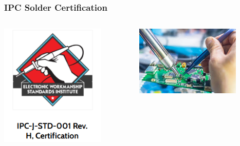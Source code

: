\documentclass{beamer}
\begin{document}
\begin{frame}\frametitle{IPC Solder Certification}
\begin{columns}
\begin{column}{5.5cm}
	\begin{center}	
	\includegraphics[width=5cm]{fig/ipc1.png} 
	\end{center}
\end{column}
\begin{column}{5.5cm}
	\begin{center}	
	\includegraphics[width=5cm]{fig/ipc2.jpg} 
	\end{center}
\end{column}
\end{columns}
\end{frame}
\end{document}
